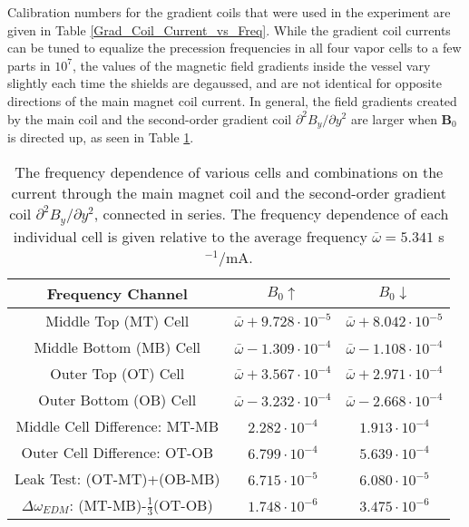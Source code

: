 \documentclass [10pt, twoside] {uwthesis}[2012/04/02]
\begin{document}
Calibration numbers for the gradient coils that were used in the experiment are given in Table \ref{Grad_Coil_Current_vs_Freq}. While the gradient coil currents can be tuned to equalize the precession frequencies in all four vapor cells to a few parts in $10^7$, the values of the magnetic field gradients inside the vessel vary slightly each time the shields are degaussed, and are not identical for opposite directions of the main magnet coil current. In general, the field gradients created by the main coil and the second-order gradient coil $\partial^2 B_y/\partial y^2$ are larger when $\mathbf{B}_0$ is directed up, as seen in Table \ref{Main_Coil_Current_vs_Freq}. 

\begin{table}[ht]
\begin{center} 																							
\caption[Cell frequency dependence on $B_0$ coil and  $\partial^2 B_y/\partial y^2$ ] 
{\narrower The frequency dependence of various cells and combinations on the current through the main magnet coil and the second-order gradient coil $\partial^2 B_y/\partial y^2$, connected in series. The frequency dependence of each individual cell is given relative to the average frequency $\bar{\omega} = 5.341$ s$^{-1}$/mA.} \label{Main_Coil_Current_vs_Freq} 		
\begin{tabular}{ccc}
\hline \hline 
Frequency Channel & $B_0 \uparrow$ & $B_0 \downarrow$ \\ [0.5ex]		
\hline                   														
Middle Top (MT) Cell & $\bar{\omega} + 9.728\cdot 10^{-5}$ & $\bar{\omega} + 8.042\cdot 10^{-5}$ \\
Middle Bottom (MB) Cell & $\bar{\omega} - 1.309\cdot 10^{-4}$ & $\bar{\omega} - 1.108\cdot 10^{-4}$ \\ 
Outer Top (OT) Cell & $\bar{\omega} + 3.567\cdot 10^{-4}$ & $\bar{\omega} + 2.971\cdot 10^{-4}$ \\
Outer Bottom (OB) Cell & $\bar{\omega} - 3.232\cdot 10^{-4}$ & $\bar{\omega} -2.668 \cdot 10^{-4}$ \\ 	
Middle Cell Difference: MT-MB & $2.282\cdot 10^{-4}$ & $1.913\cdot 10^{-4}$ \\
Outer Cell Difference: OT-OB & $6.799\cdot 10^{-4}$ & $5.639\cdot 10^{-4}$ \\
Leak Test: (OT-MT)+(OB-MB) & $6.715\cdot 10^{-5}$ & $6.080\cdot 10^{-5}$ \\
$\Delta\omega_{EDM}$: (MT-MB)-$\frac{1}{3}$(OT-OB) & $1.748\cdot 10^{-6}$ & $3.475\cdot 10^{-6}$ \\  
[1ex]	
\hline
\end{tabular}
\end{center}													
\end{table}
\end{document}

